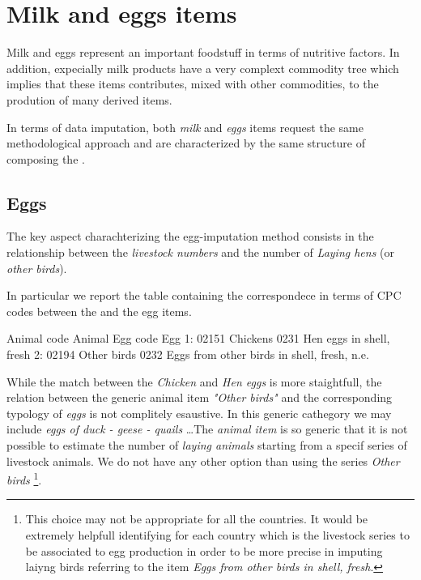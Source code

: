 \documentclass[nojss]{jss}
\begin{document}
\section{ Milk and eggs items}

Milk and eggs represent an important foodstuff in terms of nutritive factors. In addition, expecially milk products have a very complext commodity tree which implies that these items contributes, mixed with other commodities, to the prodution of many derived items.

In terms of data imputation, both \textit{milk} and \textit{eggs} items request the same methodological approach and are characterized by the same structure of  composing the .

\subsection{Eggs}

The key aspect charachterizing the egg-imputation method consists in the relationship between the \textit{livestock numbers} and the number of \textit{Laying hens} (or \textit{other birds}).

In particular we report the table containing the correspondece in terms of CPC codes between the  and the egg items.

\begin{Schunk}
\begin{Soutput}
   Animal code      Animal Egg code                                         Egg
1:       02151    Chickens     0231                    Hen eggs in shell, fresh
2:       02194 Other birds     0232 Eggs from other birds in shell, fresh, n.e.
\end{Soutput}
\end{Schunk}

While the match between the \textit{Chicken} and \textit{Hen eggs} is more staightfull, the relation between the generic animal item \textit{"Other birds"} and the corresponding typology of \textit{eggs} is not complitely esaustive. In this generic cathegory we may include \textit{eggs of duck - geese - quails }\dots The \textit{animal item} is so generic that it is not possible to estimate the number of \textit{laying animals} starting from a specif series of livestock animals. We do not have any other option than using the series \textit{Other birds} \footnote{This choice may not be appropriate for all the countries. It would be extremely helpfull identifying for each country which is the livestock series to be associated to egg production in order to be more precise in imputing laiyng birds referring to the item \textit{Eggs from other birds in shell, fresh}. }.
\end{document}

